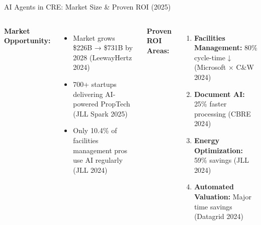 \documentclass{beamer}
\begin{document}

\begin{frame}{AI Agents in CRE: Market Size \& Proven ROI (2025)}
  \begin{columns}
      \begin{minipage}[t]{0.48\textwidth}
        \textbf{Market Opportunity:}
        \begin{itemize}
          \item Market grows \$226B → \$731B by 2028 {\tiny(LeewayHertz 2024)}
          \item 700+ startups delivering AI-powered PropTech {\tiny(JLL Spark 2025)}
          \item Only 10.4\% of facilities management pros use AI regularly {\tiny(JLL 2024)}
        \end{itemize}
      \end{minipage}
      \hfill
      \begin{minipage}[t]{0.48\textwidth}
        \textbf{Proven ROI Areas:}
        \begin{enumerate}
          \item \textbf{Facilities Management:} 80\% cycle-time ↓ {\tiny(Microsoft × C\&W 2024)}
          \item \textbf{Document AI:} 25\% faster processing {\tiny(CBRE 2024)}
          \item \textbf{Energy Optimization:} 59\% savings {\tiny(JLL 2024)}
          \item \textbf{Automated Valuation:} Major time savings {\tiny(Datagrid 2024)}
        \end{enumerate}
      \end{minipage}
  \end{columns}
\end{frame}
\end{document}
